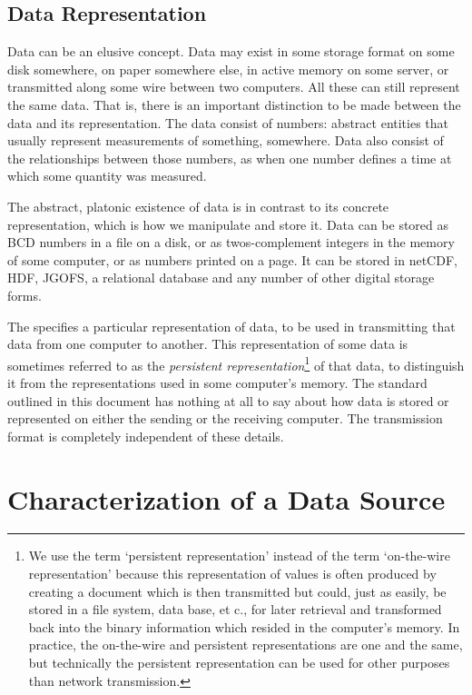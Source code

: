 \documentclass[justify]{nasa-ese}
\renewcommand{\new}[1]{\emph{#1}}
\begin{document}
\subsection{Data Representation}
\label{sec:data-representation}

Data can be an elusive concept.  Data may exist in some storage format
on some disk somewhere, on paper somewhere else, in active memory on
some server, or transmitted along some wire between two computers.
All these can still represent the same data.  That is, there is an
important distinction to be made between the data and its
representation.  The data consist of numbers: abstract entities that
usually represent measurements of something, somewhere.  Data also
consist of the relationships between those numbers, as when one number
defines a time at which some quantity was measured.  

The abstract, platonic existence of data is in contrast to its
concrete representation, which is how we manipulate and store it. Data
can be stored as BCD numbers in a file on a disk, or as
twos-complement integers in the memory of some computer, or as numbers
printed on a page. It can be stored in netCDF, HDF, JGOFS, a
relational database and any number of other digital storage forms.

The \DAP specifies a particular representation of data, to be used in
transmitting that data from one computer to another. This representation of
some data is sometimes referred to as the \new{persistent
representation}\footnote{We use the term `persistent representation' instead
of the term `on-the-wire representation' because this representation of values
is often produced by creating a document which is then transmitted but could,
just as easily, be stored in a file system, data base, et c., for later
retrieval and transformed back into the binary information which resided in
the computer's memory. In practice, the on-the-wire and persistent
representations are one and the same, but technically the persistent
representation can be used for other purposes than network transmission.} of
that data, to distinguish it from the representations used in some computer's
memory. The \DAP standard outlined in this document has nothing at all to say
about how data is stored or represented on either the sending or the
receiving computer. The \DAP transmission format is completely independent of
these details.


\section{Characterization of a Data Source}
\end{document}

